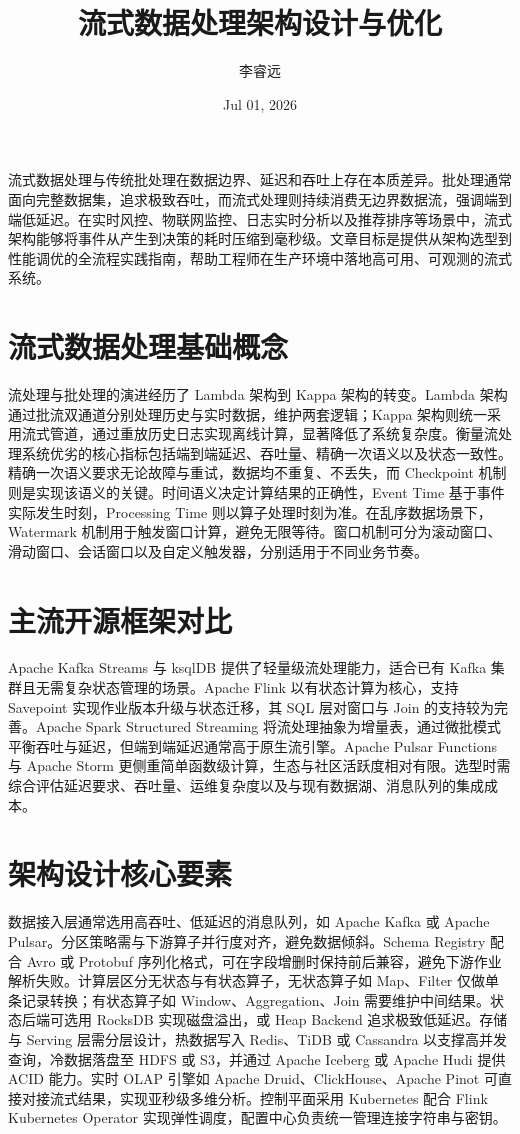 \title{流式数据处理架构设计与优化}
\author{李睿远}
\date{Jul 01, 2026}
\maketitle
流式数据处理与传统批处理在数据边界、延迟和吞吐上存在本质差异。批处理通常面向完整数据集，追求极致吞吐，而流式处理则持续消费无边界数据流，强调端到端低延迟。在实时风控、物联网监控、日志实时分析以及推荐排序等场景中，流式架构能够将事件从产生到决策的耗时压缩到毫秒级。文章目标是提供从架构选型到性能调优的全流程实践指南，帮助工程师在生产环境中落地高可用、可观测的流式系统。\par
\chapter{流式数据处理基础概念}
流处理与批处理的演进经历了 Lambda 架构到 Kappa 架构的转变。Lambda 架构通过批流双通道分别处理历史与实时数据，维护两套逻辑；Kappa 架构则统一采用流式管道，通过重放历史日志实现离线计算，显著降低了系统复杂度。衡量流处理系统优劣的核心指标包括端到端延迟、吞吐量、精确一次语义以及状态一致性。精确一次语义要求无论故障与重试，数据均不重复、不丢失，而 Checkpoint 机制则是实现该语义的关键。时间语义决定计算结果的正确性，Event Time 基于事件实际发生时刻，Processing Time 则以算子处理时刻为准。在乱序数据场景下，Watermark 机制用于触发窗口计算，避免无限等待。窗口机制可分为滚动窗口、滑动窗口、会话窗口以及自定义触发器，分别适用于不同业务节奏。\par
\chapter{主流开源框架对比}
Apache Kafka Streams 与 ksqlDB 提供了轻量级流处理能力，适合已有 Kafka 集群且无需复杂状态管理的场景。Apache Flink 以有状态计算为核心，支持 Savepoint 实现作业版本升级与状态迁移，其 SQL 层对窗口与 Join 的支持较为完善。Apache Spark Structured Streaming 将流处理抽象为增量表，通过微批模式平衡吞吐与延迟，但端到端延迟通常高于原生流引擎。Apache Pulsar Functions 与 Apache Storm 更侧重简单函数级计算，生态与社区活跃度相对有限。选型时需综合评估延迟要求、吞吐量、运维复杂度以及与现有数据湖、消息队列的集成成本。\par
\chapter{架构设计核心要素}
数据接入层通常选用高吞吐、低延迟的消息队列，如 Apache Kafka 或 Apache Pulsar。分区策略需与下游算子并行度对齐，避免数据倾斜。Schema Registry 配合 Avro 或 Protobuf 序列化格式，可在字段增删时保持前后兼容，避免下游作业解析失败。计算层区分无状态与有状态算子，无状态算子如 Map、Filter 仅做单条记录转换；有状态算子如 Window、Aggregation、Join 需要维护中间结果。状态后端可选用 RocksDB 实现磁盘溢出，或 Heap Backend 追求极致低延迟。存储与 Serving 层需分层设计，热数据写入 Redis、TiDB 或 Cassandra 以支撑高并发查询，冷数据落盘至 HDFS 或 S3，并通过 Apache Iceberg 或 Apache Hudi 提供 ACID 能力。实时 OLAP 引擎如 Apache Druid、ClickHouse、Apache Pinot 可直接对接流式结果，实现亚秒级多维分析。控制平面采用 Kubernetes 配合 Flink Kubernetes Operator 实现弹性调度，配置中心负责统一管理连接字符串与密钥。\par
